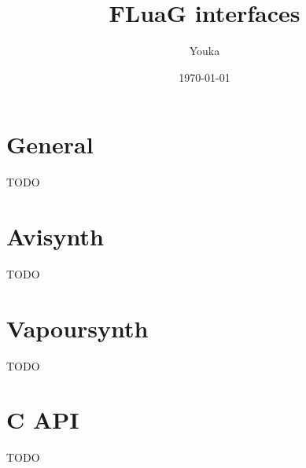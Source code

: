 \documentclass[12pt]{article}
\title{FLuaG interfaces}
\author{Youka}
\date{\today}
\begin{document}
\maketitle
\tableofcontents

\section{General}
\label{sec:general}

TODO

\section{Avisynth}
\label{sec:avisynth}

TODO

\section{Vapoursynth}
\label{sec:vapoursynth}

TODO

\section{C API}
\label{sec:c-api}

TODO
\end{document}
